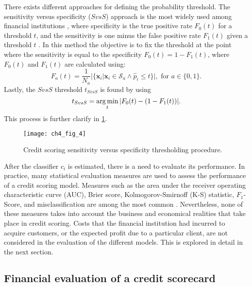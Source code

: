   There exists different approaches for defining the probability threshold. The sensitivity versus 
  specificity ($SvsS$) approach is the most widely used among financial institutions 
  \citep{Anderson2007}, where specificity is the true positive rate $F_0(t)$ for a threshold $t$, 
  and the sensitivity is one minus the false positive rate $F_1(t)$ given a threshold $t$ 
  \citep{Hernandez-Orallo2012}. In this method the objective is to fix the threshold at the point 
  where the sensitivity is equal to the specificity $F_0(t)=1-F_1(t)$, where $F_0(t)$ and $F_1(t)$ 
  are calculated using:
  \begin{equation}
   F_a(t)=\frac{1}{N_a}\vert \{ \mathbf{x}_i \vert \mathbf{x}_i \in \mathcal{S}_a \wedge \hat p_i 
  \le t \}\vert, \text{ for }  a\in\{0,1\}.
  \end{equation}
  Lastly, the $SvsS$ threshold $t_{SvsS}$ is found by using
  \begin{equation}
  t_{SvsS}= \operatorname*{arg\,min}_t \vert F_0(t) - (1-F_1(t)) \vert.
  \end{equation}
  This process is further clarify in \figurename{ \ref{fig:ch4:4}}.
  
  \begin{figure}
  \centering
  \centering
  \texttt{[image: ch4\_fig\_4]}
  \caption{Credit scoring sensitivity versus specificity thresholding procedure.}
  \label{fig:ch4:4}
  \end{figure}
  
  After the classifier $c_i$ is estimated, there is a need to evaluate its performance. In 
  practice, many statistical evaluation measures are used to assess the performance of a credit 
  scoring model. Measures such as the area under the  receiver operating characteristic curve (AUC),
  Brier score, Kolmogorov-Smirnoff (K-S) statistic,  $F_1$-Score, and misclassification are among 
  the most common \citep{Beling2005}. Nevertheless, none of these measures takes into account the 
  business and economical realities that take place in credit scoring. Costs that the financial 
  institution had incurred to acquire customers, or the expected profit due to a particular client, 
  are not considered in the evaluation of the different models. This is explored in detail in the 
  next section.

  
  \subsection{Financial evaluation of a credit scorecard }
  
